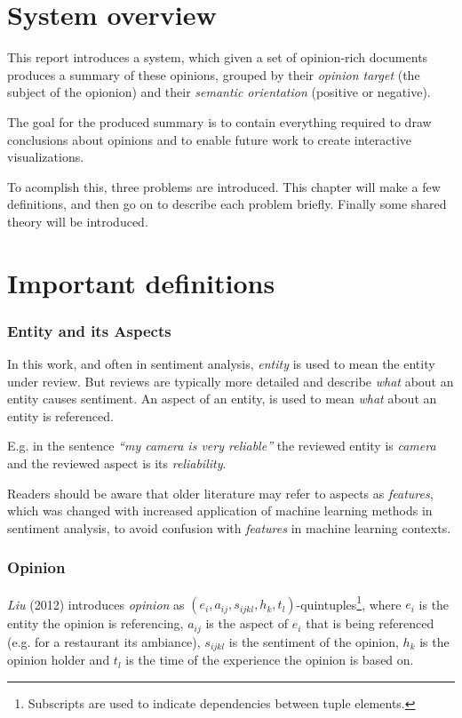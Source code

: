 \documentclass[a4paper,11pt]{kth-mag}
\begin{document}
\section{System overview}
This report introduces a system, which given a set of opinion-rich documents produces a summary of these
opinions, grouped by their \emph{opinion target} (the subject of the opionion)
and their \emph{semantic orientation} (positive or negative).

The goal for the produced summary is to contain everything required to draw conclusions about opinions
and to enable future work to create interactive visualizations.

To acomplish this, three problems are introduced. This chapter will make a few definitions, and then go on to
describe each problem briefly. Finally some shared theory will be introduced.



\section{Important definitions}

\subsubsection{Entity and its Aspects}
In this work, and often in sentiment analysis, \emph{entity} is used to mean the entity under review. But reviews are typically more detailed
and describe \emph{what} about an entity causes sentiment. An aspect of an entity, is used to mean \emph{what} about an entity is referenced.

E.g. in the sentence \emph{``my camera is very reliable''} the reviewed entity is \emph{camera} and the reviewed aspect is its \emph{reliability}.

Readers should be aware that older literature may refer to aspects as \emph{features}, which was changed with increased application of machine learning methods in sentiment analysis, to avoid confusion with \emph{features} in machine learning contexts.

\vspace{1cm}

\subsubsection{Opinion}
\emph{Liu} (2012) introduces \emph{opinion} as $(e_i,a_{ij},s_{ijkl},h_k,t_l)$-quintuples\footnote{Subscripts are
  used to indicate dependencies between tuple elements.},
where $e_i$ is the entity the opinion is referencing,
$a_{ij}$ is the aspect of $e_i$ that is being referenced (e.g. for a restaurant its ambiance),
$s_{ijkl}$ is the sentiment of the opinion,
$h_k$ is the opinion holder and
$t_l$ is the time of the experience the opinion is based on\cite[Chapter~2.1]{liu2012sentiment}.
\end{document}
